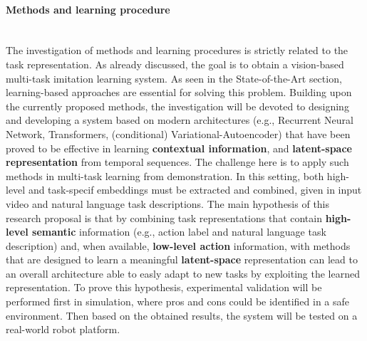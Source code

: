 \paragraph{Methods and learning procedure} \mbox{} \\
The investigation of methods and learning procedures is strictly related to the task representation.
As already discussed, the goal is to obtain a vision-based multi-task imitation learning system. As seen in the State-of-the-Art section, learning-based approaches are essential for solving this problem. Building upon the currently proposed methods, the investigation will be devoted to designing and developing a system based on modern architectures (e.g., Recurrent Neural Network, Transformers, (conditional) Variational-Autoencoder) that have been proved to be effective in learning \textbf{contextual information}, and \textbf{latent-space representation} from temporal sequences. The challenge here is to apply such methods in multi-task learning from demonstration. In this setting, both high-level and task-specif embeddings must be extracted and combined, given in input video and natural language task descriptions. 
\newline The main hypothesis of this research proposal is that by combining task representations that contain \textbf{high-level semantic} information (e.g., action label and natural language task description) and, when available, \textbf{low-level action} information, with methods that are designed to learn a meaningful \textbf{latent-space} representation can lead to an overall architecture able to easly adapt to new tasks by exploiting the learned representation.
To prove this hypothesis, experimental validation will be performed first in simulation, where pros and cons could be identified in a safe environment. Then based on the obtained results, the system will be tested on a real-world robot platform.

